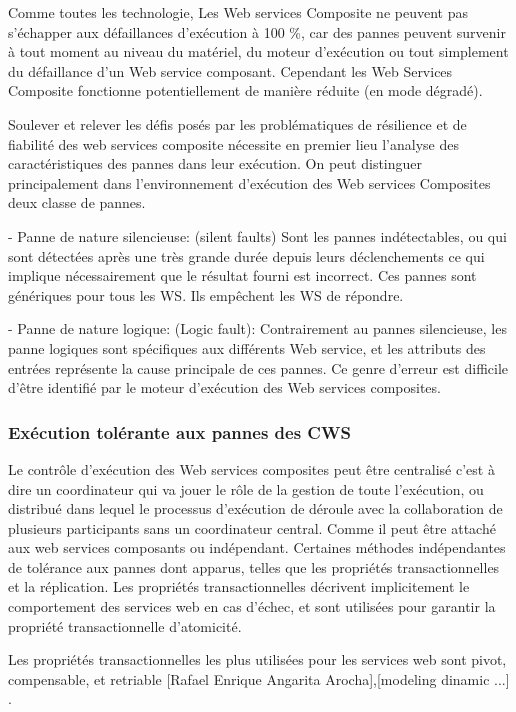 Comme toutes les technologie, Les Web services Composite ne peuvent pas s’échapper aux défaillances d’exécution à 100 \%, car des pannes peuvent survenir à tout moment au niveau du matériel, du moteur d’exécution ou tout simplement du défaillance d’un Web service composant.
Cependant les Web Services Composite fonctionne potentiellement de manière réduite (en mode dégradé).


Soulever et relever les défis posés par les problématiques de résilience et de fiabilité des web services composite nécessite en premier lieu l’analyse  des caractéristiques des pannes dans  leur exécution.
On peut distinguer principalement dans l’environnement d’exécution des Web services Composites deux classe de pannes. 

    - Panne de nature silencieuse: (silent faults) Sont les pannes indétectables, ou qui sont détectées après une très grande durée depuis leurs déclenchements ce qui implique nécessairement que le résultat fourni est incorrect. 
    Ces pannes sont génériques pour tous les WS. Ils empêchent les WS de répondre.


    - Panne de nature logique: (Logic fault): Contrairement au pannes silencieuse, les panne logiques sont spécifiques aux différents Web service, et les attributs des entrées représente la cause principale de ces pannes.
    Ce genre d’erreur est difficile d’être identifié par le moteur d’exécution des Web services composites.

\subsubsection{Exécution tolérante aux pannes des CWS}

Le contrôle d'exécution des Web services composites peut être centralisé c’est à dire un coordinateur qui va jouer le rôle de la gestion de toute l’exécution,  ou distribué dans lequel le processus d’exécution de déroule avec la collaboration de plusieurs participants sans un coordinateur central. Comme il peut être attaché aux web services composants ou indépendant.
Certaines méthodes indépendantes de tolérance aux pannes dont apparus, telles que les propriétés transactionnelles et la réplication. Les propriétés transactionnelles décrivent implicitement le comportement des services web en cas d'échec, et sont utilisées pour garantir la propriété transactionnelle d’atomicité.

Les propriétés transactionnelles les plus utilisées pour les services web sont pivot, compensable, et retriable [Rafael Enrique Angarita Arocha],[modeling dinamic ...] \cite{1}. 
 
